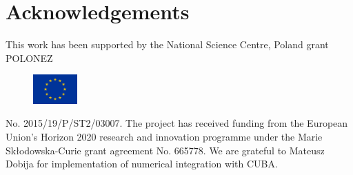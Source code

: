 \documentclass{PoS}
\begin{document}
\section*{Acknowledgements}

This work has been supported by the National Science Centre, Poland grant
POLONEZ  
\begin{figure}
  \centering
  \vspace{-10pt}
  \includegraphics[width=0.15\textwidth]{plots/flag_yellow_low.jpg}
\end{figure}
%
No. 2015/19/P/ST2/03007. 
%
The project has received funding from the
European Union's Horizon 2020 research  and  innovation  programme  under  the
Marie Sk\l{}odowska-Curie grant agreement No. 665778.
%
We are grateful to Mateusz Dobija for implementation of numerical integration
with CUBA.  
\end{document}
